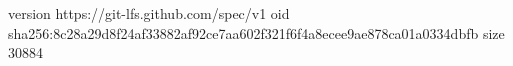 version https://git-lfs.github.com/spec/v1
oid sha256:8c28a29d8f24af33882af92ce7aa602f321f6f4a8ecee9ae878ca01a0334dbfb
size 30884
